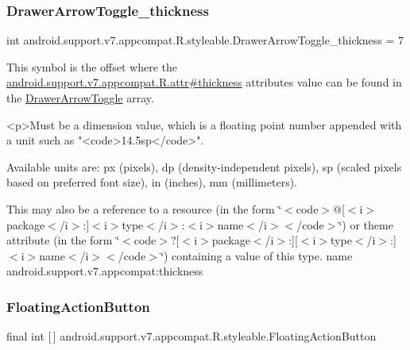 \subsubsection{\texorpdfstring{Drawer\+Arrow\+Toggle\+\_\+thickness}{DrawerArrowToggle\_thickness}}
{\footnotesize\ttfamily int android.\+support.\+v7.\+appcompat.\+R.\+styleable.\+Drawer\+Arrow\+Toggle\+\_\+thickness = 7\hspace{0.3cm}{\ttfamily [static]}}

This symbol is the offset where the \hyperlink{classandroid_1_1support_1_1v7_1_1appcompat_1_1R_1_1attr_ac3b33a84f49379c0a08a95d40b284a88}{android.\+support.\+v7.\+appcompat.\+R.\+attr\#thickness} attribute\textquotesingle{}s value can be found in the \hyperlink{classandroid_1_1support_1_1v7_1_1appcompat_1_1R_1_1styleable_a7bd3ecc07eb763b454c40c0871959a35}{Drawer\+Arrow\+Toggle} array.

\begin{DoxyVerb}      <p>Must be a dimension value, which is a floating point number appended with a unit such as "<code>14.5sp</code>".
\end{DoxyVerb}
 Available units are\+: px (pixels), dp (density-\/independent pixels), sp (scaled pixels based on preferred font size), in (inches), mm (millimeters). 

This may also be a reference to a resource (in the form \char`\"{}$<$code$>$@\mbox{[}$<$i$>$package$<$/i$>$\+:\mbox{]}$<$i$>$type$<$/i$>$\+:$<$i$>$name$<$/i$>$$<$/code$>$\char`\"{}) or theme attribute (in the form \char`\"{}$<$code$>$?\mbox{[}$<$i$>$package$<$/i$>$\+:\mbox{]}\mbox{[}$<$i$>$type$<$/i$>$\+:\mbox{]}$<$i$>$name$<$/i$>$$<$/code$>$\char`\"{}) containing a value of this type.  name android.\+support.\+v7.\+appcompat\+:thickness \mbox{\label{classandroid_1_1support_1_1v7_1_1appcompat_1_1R_1_1styleable_a9bfca89352160169125a89277e9fb2a1}} 
\subsubsection{\texorpdfstring{Floating\+Action\+Button}{FloatingActionButton}}
{\footnotesize\ttfamily final int \mbox{[}$\,$\mbox{]} android.\+support.\+v7.\+appcompat.\+R.\+styleable.\+Floating\+Action\+Button\hspace{0.3cm}{\ttfamily [static]}}

